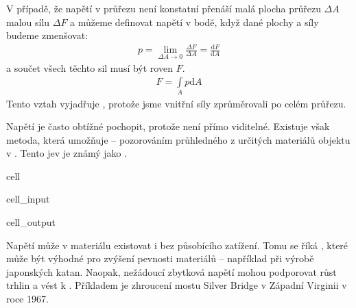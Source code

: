 \documentclass[letterpaper,10pt,english]{jupyterBook}
\begin{document}
\sphinxAtStartPar
V případě, že napětí v průřezu není konstatní přenáší malá plocha průřezu \(\Delta A\) malou sílu \(\Delta F\) a můžeme definovat napětí v bodě, když dané plochy a síly budeme zmenšovat:
\begin{equation*}
\begin{split} 
p = \lim\limits_{\Delta A \rightarrow 0} \frac{\Delta F}{\Delta A} = \frac{\mathrm{d}F}{\mathrm{d}A}
\end{split}
\end{equation*}
\sphinxAtStartPar
a součet všech těchto sil musí být roven  \(F\).
\begin{equation*}
\begin{split} 
F = \int\limits_A p \mathrm{d}A
\end{split}
\end{equation*}
\sphinxAtStartPar
Tento vztah vyjadřuje , protože jsme vnitřní síly zprůměrovali po celém průřezu.

\sphinxAtStartPar
Napětí je často obtížné pochopit, protože není přímo viditelné. Existuje však metoda, která umožňuje  – pozorováním průhledného z určitých materiálů objektu v . Tento jev je známý jako .

\begin{sphinxuseclass}{cell}\begin{sphinxVerbatimInput}

\begin{sphinxuseclass}{cell_input}
\begin{sphinxVerbatim}[commandchars=\\\{\}]
\end{sphinxVerbatim}

\end{sphinxuseclass}\end{sphinxVerbatimInput}
\begin{sphinxVerbatimOutput}

\begin{sphinxuseclass}{cell_output}
\noindent{}

\end{sphinxuseclass}\end{sphinxVerbatimOutput}

\end{sphinxuseclass}
\sphinxAtStartPar
Napětí může v materiálu existovat i bez působícího zatížení. Tomu se říká , které může být výhodné pro zvýšení pevnosti materiálů – například při výrobě japonských katan. Naopak, nežádoucí zbytková napětí mohou podporovat růst trhlin a vést k . Příkladem je zhroucení mostu Silver Bridge v Západní Virginii v roce 1967.
\end{document}
